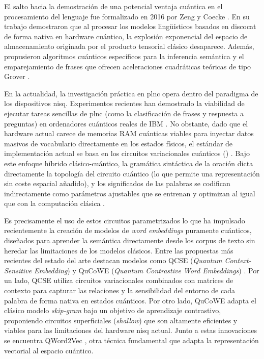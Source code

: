El salto hacia la demostración de una potencial ventaja cuántica en el procesamiento del lenguaje fue formalizado en 2016 por Zeng y Coecke \cite{zeng_quantum_algorithms_2016}. En su trabajo demostraron que al procesar los modelos lingüísticos basados en \gls{discocat} de forma nativa en hardware cuántico, la explosión exponencial del espacio de almacenamiento originada por el producto tensorial clásico desaparece. Además, propusieron algoritmos cuánticos específicos para la inferencia semántica y el emparejamiento de frases que ofrecen aceleraciones cuadráticas teóricas de tipo Grover \cite{zeng_quantum_algorithms_2016}.

En la actualidad, la investigación práctica en \gls{plnc} opera dentro del paradigma de los dispositivos \gls{nisq}. Experimentos recientes han demostrado la viabilidad de ejecutar tareas sencillas de \gls{plnc} (como la clasificación de frases y respuesta a preguntas) en ordenadores cuánticos reales de IBM \cite{coecke_actual_computer_2020, meichanetzidis_grammar_aware_2020}. No obstante, dado que el hardware actual carece de memorias RAM cuánticas viables para inyectar datos masivos de vocabulario directamente en los estados físicos, el estándar de implementación actual se basa en los circuitos variacionales cuánticos () \cite{benedetti_parameterized_quantum_2019, ma_variational_quantum_2019, schuld_circuit_centric_2020}. Bajo este enfoque híbrido clásico-cuántico, la gramática sintáctica de la oración dicta directamente la topología del circuito cuántico (lo que permite una representación sin coste espacial añadido), y los significados de las palabras se codifican indirectamente como parámetros ajustables que se entrenan y optimizan al igual que con la computación clásica \cite{benedetti_parameterized_quantum_2019}.

Es precisamente el uso de estos circuitos parametrizados lo que ha impulsado recientemente la creación de modelos de \textit{word embeddings} puramente cuánticos, diseñados para aprender la semántica directamente desde los corpus de texto sin heredar las limitaciones de los modelos clásicos. Entre las propuestas más recientes del estado del arte destacan modelos como QCSE (\textit{Quantum Context-Sensitive Embedding}) \cite{varmantchaonala_qcse_2025} y QuCoWE (\textit{Quantum Contrastive Word Embeddings}) \cite{karanjai_qucowe_2025}. Por un lado, QCSE utiliza circuitos variacionales combinados con matrices de contexto para capturar las relaciones y la sensibilidad del entorno de cada palabra de forma nativa en estados cuánticos. Por otro lado, QuCoWE adapta el clásico modelo \textit{skip-gram} bajo un objetivo de aprendizaje contrastivo, proponiendo circuitos superficiales (\textit{shallow}) que son altamente eficientes y viables para las limitaciones del hardware \gls{nisq} actual. Junto a estas innovaciones se encuentra QWord2Vec \cite{ohno_qword2vec_2025}, otra técnica fundamental que adapta la representación vectorial al espacio cuántico.


